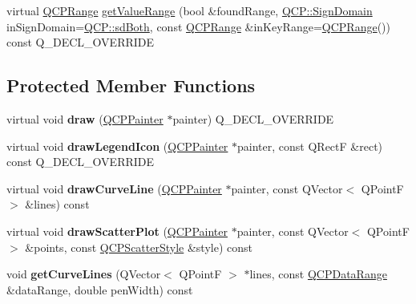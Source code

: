 \begin{DoxyCompactItemize}
\item 
virtual \hyperlink{classQCPRange}{Q\+C\+P\+Range} \hyperlink{classQCPCurve_a8bb8e3b9085f15921dc40483fb025ab2}{get\+Value\+Range} (bool \&found\+Range, \hyperlink{namespaceQCP_afd50e7cf431af385614987d8553ff8a9}{Q\+C\+P\+::\+Sign\+Domain} in\+Sign\+Domain=\hyperlink{namespaceQCP_afd50e7cf431af385614987d8553ff8a9aa38352ef02d51ddfa4399d9551566e24}{Q\+C\+P\+::sd\+Both}, const \hyperlink{classQCPRange}{Q\+C\+P\+Range} \&in\+Key\+Range=\hyperlink{classQCPRange}{Q\+C\+P\+Range}()) const Q\+\_\+\+D\+E\+C\+L\+\_\+\+O\+V\+E\+R\+R\+I\+DE
\end{DoxyCompactItemize}
\subsection*{Protected Member Functions}
\begin{DoxyCompactItemize}
\item 
virtual void {\bfseries draw} (\hyperlink{classQCPPainter}{Q\+C\+P\+Painter} $\ast$painter) Q\+\_\+\+D\+E\+C\+L\+\_\+\+O\+V\+E\+R\+R\+I\+DE\hypertarget{classQCPCurve_ac199d41d23865cd68bd7b598308a4433}{}\label{classQCPCurve_ac199d41d23865cd68bd7b598308a4433}

\item 
virtual void {\bfseries draw\+Legend\+Icon} (\hyperlink{classQCPPainter}{Q\+C\+P\+Painter} $\ast$painter, const Q\+RectF \&rect) const Q\+\_\+\+D\+E\+C\+L\+\_\+\+O\+V\+E\+R\+R\+I\+DE\hypertarget{classQCPCurve_aac6e94afbce4002d2cd7793250154e84}{}\label{classQCPCurve_aac6e94afbce4002d2cd7793250154e84}

\item 
virtual void {\bfseries draw\+Curve\+Line} (\hyperlink{classQCPPainter}{Q\+C\+P\+Painter} $\ast$painter, const Q\+Vector$<$ Q\+PointF $>$ \&lines) const \hypertarget{classQCPCurve_a2d657f89bfb5a5da35a063dca997c583}{}\label{classQCPCurve_a2d657f89bfb5a5da35a063dca997c583}

\item 
virtual void {\bfseries draw\+Scatter\+Plot} (\hyperlink{classQCPPainter}{Q\+C\+P\+Painter} $\ast$painter, const Q\+Vector$<$ Q\+PointF $>$ \&points, const \hyperlink{classQCPScatterStyle}{Q\+C\+P\+Scatter\+Style} \&style) const \hypertarget{classQCPCurve_a783b6188a81617380534e41539f55ed3}{}\label{classQCPCurve_a783b6188a81617380534e41539f55ed3}

\item 
void {\bfseries get\+Curve\+Lines} (Q\+Vector$<$ Q\+PointF $>$ $\ast$lines, const \hyperlink{classQCPDataRange}{Q\+C\+P\+Data\+Range} \&data\+Range, double pen\+Width) const \hypertarget{classQCPCurve_a90999a3378969ed08046395fa8fab37b}{}\label{classQCPCurve_a90999a3378969ed08046395fa8fab37b}


\end{DoxyCompactItemize}
